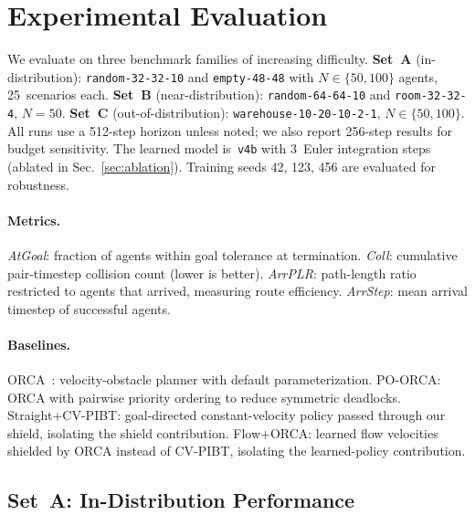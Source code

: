 
\section{Experimental Evaluation}\label{sec:results}

We evaluate on three benchmark families of increasing difficulty.
\textbf{Set~A} (in-distribution): \texttt{random-32-32-10} and \texttt{empty-48-48}
with $N\!\in\!\{50,100\}$ agents, 25~scenarios each.
\textbf{Set~B} (near-distribution): \texttt{random-64-64-10} and
\texttt{room-32-32-4}, $N\!=\!50$.
\textbf{Set~C} (out-of-distribution): \texttt{warehouse-10-20-10-2-1},
$N\!\in\!\{50,100\}$.
All runs use a 512-step horizon unless noted; we also report 256-step
results for budget sensitivity.
The learned model is~\texttt{v4b} with 3~Euler integration steps
(ablated in Sec.~\ref{sec:ablation}).
Training seeds 42, 123, 456 are evaluated for robustness.

\paragraph{Metrics.}
\emph{AtGoal}: fraction of agents within goal tolerance at termination.
\emph{Coll}: cumulative pair-timestep collision count (lower is better).
\emph{ArrPLR}: path-length ratio restricted to agents that arrived, measuring route efficiency.
\emph{ArrStep}: mean arrival timestep of successful agents.

\paragraph{Baselines.}
ORCA~\cite{vandenberg2011orca}: velocity-obstacle planner with default parameterization.
PO-ORCA: ORCA with pairwise priority ordering to reduce symmetric deadlocks.
Straight+CV-PIBT: goal-directed constant-velocity policy passed through our shield, isolating the shield contribution.
Flow+ORCA: learned flow velocities shielded by ORCA instead of CV-PIBT, isolating the learned-policy contribution.

\subsection{Set~A: In-Distribution Performance}\label{sec:seta}

